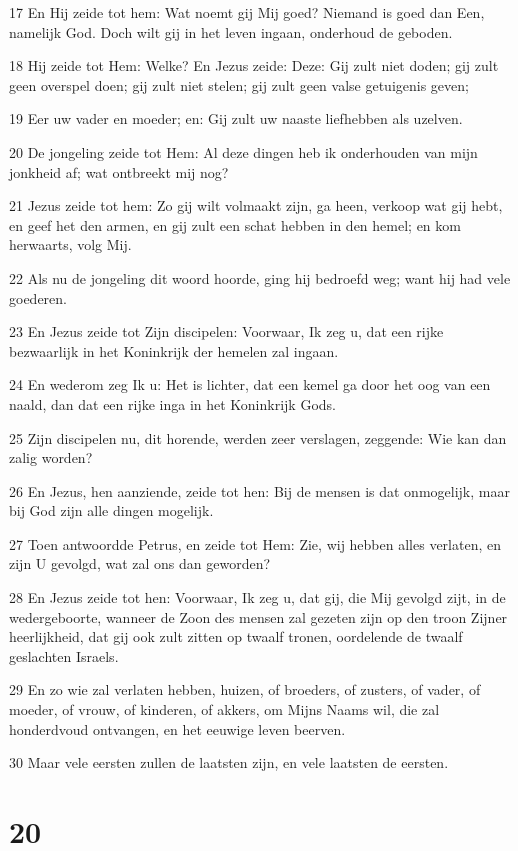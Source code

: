 \par 17 En Hij zeide tot hem: Wat noemt gij Mij goed? Niemand is goed dan Een, namelijk God. Doch wilt gij in het leven ingaan, onderhoud de geboden.
\par 18 Hij zeide tot Hem: Welke? En Jezus zeide: Deze: Gij zult niet doden; gij zult geen overspel doen; gij zult niet stelen; gij zult geen valse getuigenis geven;
\par 19 Eer uw vader en moeder; en: Gij zult uw naaste liefhebben als uzelven.
\par 20 De jongeling zeide tot Hem: Al deze dingen heb ik onderhouden van mijn jonkheid af; wat ontbreekt mij nog?
\par 21 Jezus zeide tot hem: Zo gij wilt volmaakt zijn, ga heen, verkoop wat gij hebt, en geef het den armen, en gij zult een schat hebben in den hemel; en kom herwaarts, volg Mij.
\par 22 Als nu de jongeling dit woord hoorde, ging hij bedroefd weg; want hij had vele goederen.
\par 23 En Jezus zeide tot Zijn discipelen: Voorwaar, Ik zeg u, dat een rijke bezwaarlijk in het Koninkrijk der hemelen zal ingaan.
\par 24 En wederom zeg Ik u: Het is lichter, dat een kemel ga door het oog van een naald, dan dat een rijke inga in het Koninkrijk Gods.
\par 25 Zijn discipelen nu, dit horende, werden zeer verslagen, zeggende: Wie kan dan zalig worden?
\par 26 En Jezus, hen aanziende, zeide tot hen: Bij de mensen is dat onmogelijk, maar bij God zijn alle dingen mogelijk.
\par 27 Toen antwoordde Petrus, en zeide tot Hem: Zie, wij hebben alles verlaten, en zijn U gevolgd, wat zal ons dan geworden?
\par 28 En Jezus zeide tot hen: Voorwaar, Ik zeg u, dat gij, die Mij gevolgd zijt, in de wedergeboorte, wanneer de Zoon des mensen zal gezeten zijn op den troon Zijner heerlijkheid, dat gij ook zult zitten op twaalf tronen, oordelende de twaalf geslachten Israels.
\par 29 En zo wie zal verlaten hebben, huizen, of broeders, of zusters, of vader, of moeder, of vrouw, of kinderen, of akkers, om Mijns Naams wil, die zal honderdvoud ontvangen, en het eeuwige leven beerven.
\par 30 Maar vele eersten zullen de laatsten zijn, en vele laatsten de eersten.

\chapter{20}

